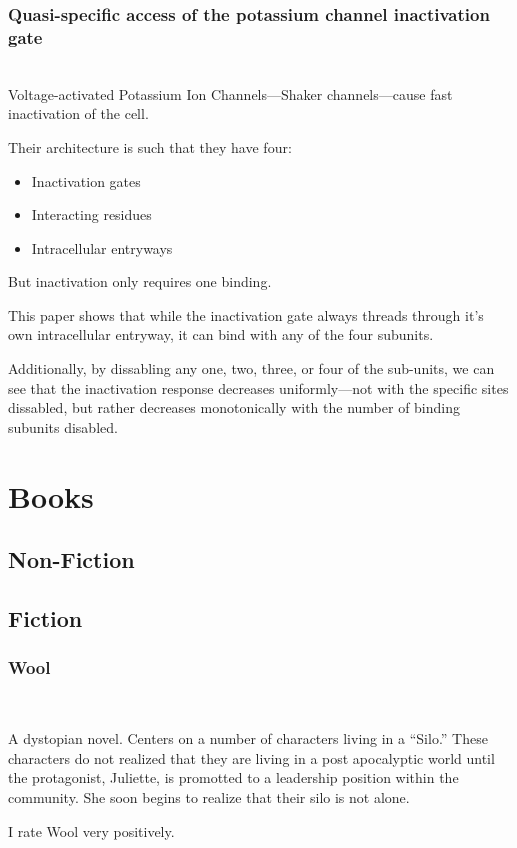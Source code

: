 \documentclass[12pt]{article}
\newenvironment{annotatedcitation}[2]%
{\bigskip \subsubsection*{#1}  \fullcite{#2} \\ \smallskip \noindent}%
{\bigskip}
\begin{document}
  \begin{annotatedcitation}{Quasi-speciﬁc access of the potassium channel inactivation gate}{Venkataraman14}
    Voltage-activated Potassium Ion Channels---Shaker channels---cause
    fast inactivation of the cell.

    Their architecture is such that they have four:

    \begin{itemize}
      \item Inactivation gates
      \item Interacting residues
      \item Intracellular entryways
    \end{itemize}

    But inactivation only requires one binding.

    This paper shows that while the inactivation gate always threads
    through it's own intracellular entryway, it can bind with any of
    the four subunits.

    Additionally, by dissabling any one, two, three, or four of the
    sub-units, we can see that the inactivation response decreases
    uniformly---not with the specific sites dissabled, but rather
    decreases monotonically with the number of binding subunits
    disabled.

  \end{annotatedcitation}

\section{Books}

\subsection{Non-Fiction}

\subsection{Fiction}

  \begin{annotatedcitation}{Wool}{howey12}

    A dystopian novel. Centers on a number of characters living in a
    ``Silo.'' These characters do not realized that they are living in a
    post apocalyptic world until the protagonist, Juliette, is promotted
    to a leadership position within the community. She soon begins to
    realize that their silo is not alone.

    I rate Wool very positively.
  \end{annotatedcitation}
\end{document}

